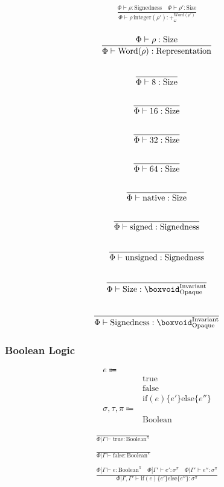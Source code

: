 \documentclass {article}
\begin{document}
\begin{gather*}
\frac
{\Phi \vdash \rho : \text{Signedness} \quad \Phi \vdash \rho' : \text{Size}}
{\Phi \vdash \rho \, \text{integer}(\rho') : +^ {\text{Word} (\rho')}_\omega } \\
\end{gather*}

\begin{gather*}
\frac
{\Phi \vdash \rho : \text{Size}}
{\Phi \vdash \text{Word} (\rho) : \text{Representation}} \\
\\
\frac
{}
{\Phi \vdash 8 : \text{Size}} \\
\\
\frac
{}
{\Phi \vdash 16 : \text{Size}} \\
\\
\frac
{}
{\Phi \vdash 32 : \text{Size}} \\
\\
\frac
{}
{\Phi \vdash 64 : \text{Size}} \\
\\
\frac
{}
{\Phi \vdash \text{native} : \text{Size}} \\
\\
\frac
{}
{\Phi \vdash \text{signed} : \text{Signedness}} \\
\\
\frac
{}
{\Phi \vdash \text{unsigned} : \text{Signedness}} \\
\\
\frac
{}
{\Phi \vdash \text{Size} : \boxvoid^\text{Invariant}_\text{Opaque}} \\
\\
\frac
{}
{\Phi \vdash \text{Signedness} : \boxvoid^\text{Invariant}_\text{Opaque}}
\end{gather*}

\subsubsection{Boolean Logic}
\begin{align*}
e \Coloneqq & \\
& \text{true} \\
& \text{false} \\
& \text{if} (e) \{ e' \} \text{else} \{ e'' \} \\
\sigma, \tau, \pi \Coloneqq & \\
& \text{Boolean}
\end{align*}

\begin{gather*}
\frac
{}
{ \Phi | \Gamma \vdash \text{true} : \text{Boolean}^\pi} \\
\\
\frac
{}
{ \Phi | \Gamma \vdash \text{false} : \text{Boolean}^\pi} \\
\\
\frac
{\Phi | \Gamma \vdash e : \text{Boolean}^\pi \quad \Phi | \Gamma' \vdash e' : \sigma^\pi \quad \Phi | \Gamma' \vdash e'' : \sigma^\pi }
{\Phi | \Gamma, \Gamma' \vdash \text{if} (e) \{ e' \} \text{else} \{ e'' \} : \sigma^\pi }
\end{gather*}
\end{document}
